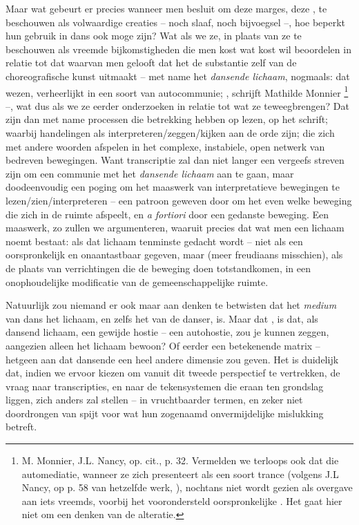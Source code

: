 {Maar wat gebeurt er precies wanneer men besluit om deze marges, deze , te beschouwen als volwaardige creaties {--} noch slaaf, noch bijvoegsel {--}, hoe beperkt hun gebruik in dans ook moge zijn? Wat als we ze, in plaats van ze te beschouwen als vreemde bijkomstigheden die men kost wat kost wil beoordelen in relatie tot dat waarvan men gelooft dat het de substantie zelf van de choreografische kunst uitmaakt {--} met name het {\em dansende lichaam}, nogmaals: dat  wezen, verheerlijkt in een soort van autocommunie; , schrijft Mathilde Monnier \footnote{M. Monnier, J.L. Nancy, op. cit., p. 32. Vermelden we terloops ook dat die automediatie, wanneer ze zich presenteert als een soort trance (volgens J.L Nancy, op p. 58 van hetzelfde werk, ), nochtans niet wordt gezien als overgave aan iets vreemds, voorbij het voorondersteld oorspronkelijke . Het gaat hier niet om een denken van de alteratie.} {--}, wat dus als we ze eerder onderzoeken in relatie tot wat ze teweegbrengen? Dat zijn dan met name processen die betrekking hebben op lezen, op het schrift; waarbij handelingen als interpreteren/zeggen/kijken aan de orde zijn; die zich met andere woorden afspelen in het complexe, instabiele, open netwerk van bedreven bewegingen. Want transcriptie zal dan niet langer een vergeefs streven zijn om een communie met het  {\em dansende lichaam} aan te gaan, maar doodeenvoudig een poging om het maaswerk van interpretatieve bewegingen te lezen/zien/interpreteren {--} een patroon geweven door om het even welke beweging die zich in de ruimte afspeelt, en {\em a fortiori} door een gedanste beweging. Een maaswerk, zo zullen we argumenteren, waaruit precies dat wat men een lichaam noemt bestaat: als dat lichaam tenminste gedacht wordt {--} niet als een oorspronkelijk en onaantastbaar gegeven, maar (meer freudiaans misschien), als de plaats van verrichtingen die de beweging doen totstandkomen, in een onophoudelijke modificatie van de gemeenschappelijke ruimte.

Natuurlijk zou niemand er ook maar aan denken te betwisten dat het {\em medium} van dans het lichaam, en zelfs het van de danser, is. Maar dat , is dat, als dansend lichaam, een gewijde hostie {--} een autohostie, zou je kunnen zeggen, aangezien alleen  het lichaam bewoon? Of eerder een betekenende matrix {--} hetgeen aan dat dansende  een heel andere dimensie zou geven. Het is duidelijk dat, indien we ervoor kiezen om vanuit dit tweede perspectief te vertrekken, de vraag naar transcripties, en naar de tekensystemen die eraan ten grondslag liggen, zich anders zal stellen {--} in vruchtbaarder termen, en zeker niet doordrongen van spijt voor wat hun zogenaamd onvermijdelijke mislukking betreft.

}
